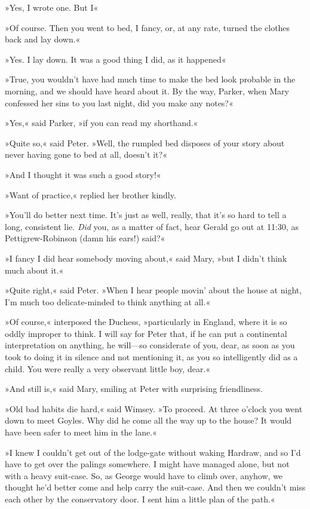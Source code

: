 »Yes, I wrote one. But I\longdash«

»Of course. Then you went to bed, I fancy, or, at any rate, turned the clothes back and lay down.«

»Yes. I lay down. It was a good thing I did, as it happened\longdash«

»True, you wouldn't have had much time to make the bed look probable in the morning, and we should have heard about it. By the way, Parker, when Mary confessed her sins to you last night, did you make any notes?«

»Yes,« said Parker, »if you can read my shorthand.«

»Quite so,« said Peter. »Well, the rumpled bed disposes of your story about never having gone to bed at all, doesn't it?«

»And I thought it was such a good story!«

»Want of practice,« replied her brother kindly.

»You'll do better next time. It's just as well, really, that it's so hard to tell a long, consistent lie. \textit{Did} you, as a matter of fact, hear Gerald go out at 11:30, as Pettigrew-Robinson (damn his ears!) said?«

»I fancy I did hear somebody moving about,« said Mary, »but I didn't think much about it.«

»Quite right,« said Peter. »When I hear people movin' about the house at night, I'm much too delicate-minded to think anything at all.«

»Of course,« interposed the Duchess, »particularly in England, where it is so oddly improper to think. I will say for Peter that, if he can put a continental interpretation on anything, he will\allowbreak---\allowbreak so considerate of you, dear, as soon as you took to doing it in silence and not mentioning it, as you so intelligently did as a child. You were really a very observant little boy, dear.«

»And still is,« said Mary, smiling at Peter with surprising friendliness.

»Old bad habits die hard,« said Wimsey. »To proceed. At three o'clock you went down to meet Goyles. Why did he come all the way up to the house? It would have been safer to meet him in the lane.«

»I knew I couldn't get out of the lodge-gate without waking Hardraw, and so I'd have to get over the palings somewhere. I might have managed alone, but not with a heavy suit-case. So, as George would have to climb over, anyhow, we thought he'd better come and help carry the suit-case. And then we couldn't miss each other by the conservatory door. I sent him a little plan of the path.«

